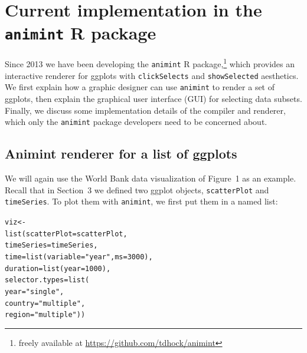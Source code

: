 \documentclass[journal]{vgtc}\usepackage[]{graphicx}\usepackage[]{color}
\makeatletter
\newcommand{\hlnum}[1]{\textcolor[rgb]{0,0,0}{#1}}%
\newcommand{\hlstr}[1]{\textcolor[rgb]{0.502,0,0}{#1}}%
\newcommand{\hlstd}[1]{\textcolor[rgb]{0,0,0}{#1}}%
\newcommand{\hlkwb}[1]{\textcolor[rgb]{0,0,0}{#1}}%
\newcommand{\hlkwc}[1]{\textcolor[rgb]{0,0,1}{#1}}%
\newcommand{\hlkwd}[1]{\textcolor[rgb]{0,0,0}{#1}}%
\newenvironment{kframe}{%
 \def\at@end@of@kframe{}%
 \ifinner\ifhmode%
  \def\at@end@of@kframe{\end{minipage}}%
  \begin{minipage}{\columnwidth}%
 \fi\fi%
 \def\FrameCommand##1{\hskip\@totalleftmargin \hskip-\fboxsep
 \colorbox{shadecolor}{##1}\hskip-\fboxsep
     \hskip-\linewidth \hskip-\@totalleftmargin \hskip\columnwidth}%
 \MakeFramed {\advance\hsize-\width
   \@totalleftmargin\z@ \linewidth\hsize
   \@setminipage}}%
 {\par\unskip\endMakeFramed%
 \at@end@of@kframe}
\newenvironment{knitrout}{}{} %
\makeatother
\begin{document}

\section{Current implementation in the \texttt{animint} R package}

Since 2013 we have been developing the \texttt{animint} R
package,\footnote{freely available at
  \url{https://github.com/tdhock/animint}} which provides an
interactive renderer for ggplots with \texttt{clickSelects} and
\texttt{showSelected} aesthetics. We first explain how a graphic
designer can use \texttt{animint} to render a set of ggplots, then explain the
graphical user interface (GUI) for selecting data subsets. Finally, we
discuss some implementation details of the compiler and renderer,
which only the \texttt{animint} package developers need to be concerned about.

\subsection{Animint renderer for a list of ggplots}

We will again use the World Bank data visualization of Figure~1 as an
example. Recall that in Section~3 we defined two ggplot objects,
\texttt{scatterPlot} and \texttt{timeSeries}. To plot them with
\texttt{animint}, we first put them in a named list:

\begin{knitrout}
\color{fgcolor}\begin{kframe}
\begin{alltt}
\hlstd{viz} \hlkwb{<-}
  \hlkwd{list}\hlstd{(}\hlkwc{scatterPlot}\hlstd{=scatterPlot,}
       \hlkwc{timeSeries}\hlstd{=timeSeries,}
       \hlkwc{time}\hlstd{=}\hlkwd{list}\hlstd{(}\hlkwc{variable}\hlstd{=}\hlstr{"year"}\hlstd{,} \hlkwc{ms}\hlstd{=}\hlnum{3000}\hlstd{),}
       \hlkwc{duration}\hlstd{=}\hlkwd{list}\hlstd{(}\hlkwc{year}\hlstd{=}\hlnum{1000}\hlstd{),}
       \hlkwc{selector.types}\hlstd{=}\hlkwd{list}\hlstd{(}
         \hlkwc{year}\hlstd{=}\hlstr{"single"}\hlstd{,}
         \hlkwc{country}\hlstd{=}\hlstr{"multiple"}\hlstd{,}
         \hlkwc{region}\hlstd{=}\hlstr{"multiple"}\hlstd{))}
\end{alltt}
\end{kframe}
\end{knitrout}
\end{document}
